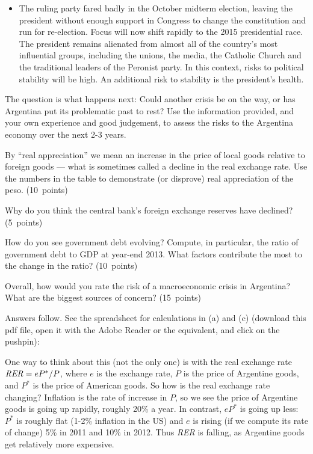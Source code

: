 \documentclass[letterpaper,12pt]{exam}
\begin{document}
\begin{questions}
\begin{itemize}
\item The ruling party fared badly in the October midterm election,
 leaving the president without enough support in Congress
 to change the constitution and run for re-election.
 Focus will now shift rapidly to the 2015 presidential race.
 The president remains alienated from almost all of the country's most influential groups,
including the unions, the media, the Catholic Church and the traditional
leaders of the Peronist party. In this context, risks to political stability will be
high. An additional risk to stability is the president's health.
\end{itemize}
%
The question is what happens next:  Could another crisis be on the way,
or has Argentina put its problematic past to rest?
Use the information provided, and your own experience and good judgement,
to assess the risks to the Argentina economy over the next 2-3 years.
%
\begin{parts}
\item By ``real appreciation'' we mean an increase in the price
of local goods relative to foreign goods ---
what is sometimes called a decline in the real exchange rate.
Use the numbers in the table to demonstrate (or disprove) real appreciation
of the peso.
(10~points)

\item Why do you think the central bank's foreign exchange reserves have declined?
(5~points)

\item How do you see government debt evolving?
Compute, in particular, the ratio of government debt to GDP at year-end 2013.
What factors contribute the most to the change in the ratio?
(10~points)

\item Overall, how would you rate the risk of a macroeconomic crisis in Argentina?
What are the biggest sources of concern?
(15~points)
\end{parts}

\begin{solution}
Answers follow.
See the spreadsheet for calculations in (a) and (c)
(download this pdf file, open it with the Adobe Reader or the equivalent,
and click on the pushpin):

\begin{parts}
\item
One way to think about this (not the only one) is with the real exchange rate
$ \mbox{\em RER\/} = eP^*/P$, where $e$ is the exchange rate, $P$ is the price of Argentine goods,
and $P^*$ is the price of American goods.
So how is the real exchange rate changing?
Inflation is the rate of increase in $P$, so we see the price of Argentine goods
is going up rapidly, roughly 20\% a year.
In contrast, $eP^*$ is going up less:
$P^*$ is roughly flat (1-2\% inflation in the US)
and $e$ is rising (if we compute its rate of change)
5\% in 2011 and 10\% in 2012.
Thus {\it RER\/} is falling, as Argentine goods get relatively more expensive.


\end{parts}
\end{solution}
\end{questions}
\end{document}
